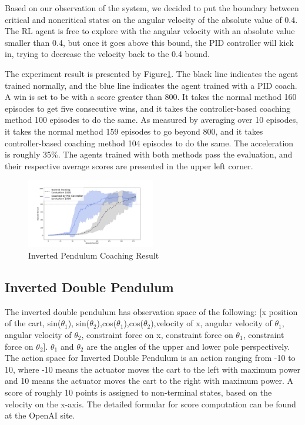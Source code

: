 \documentclass[journal]{IEEEtran}
\begin{document}
Based on our observation of the system, we decided to put the boundary between critical and noncritical states on the angular velocity of the absolute value of 0.4. The RL agent is free to explore with the angular velocity with an absolute value smaller than 0.4, but once it goes above this bound, the PID controller will kick in, trying to decrease the velocity back to the 0.4 bound.

The experiment result is presented by Figure\ref{fig:ip_result}. The black line indicates the agent trained normally, and the blue line indicates the agent trained with a PID coach. A win is set to be with a score greater than 800. It takes the normal method 160 episodes to get five consecutive wins, and it takes the controller-based coaching method 100 episodes to do the same. As measured by averaging over 10 episodes, it takes the normal method 159 episodes to go beyond 800, and it takes controller-based coaching method 104 episodes to do the same. The acceleration is roughly 35\%. The agents trained with both methods pass the evaluation, and their respective average scores are presented in the upper left corner.

\begin{figure}
     \centering
      \includegraphics[width=0.5\textwidth]{ip.png}
      \caption{Inverted Pendulum Coaching Result}
      \label{fig:ip_result}

\end{figure}

\subsection{Inverted Double Pendulum}
The inverted double pendulum has observation space of the following: [x position of the cart, sin($\theta_1$), sin($\theta_2$),cos($\theta_1$),cos($\theta_2$),velocity of x, angular velocity of $\theta_1$, angular velocity of $\theta_2$, constraint force on x, constraint force on $\theta_1$, constraint force on $\theta_2$]. $\theta_1$ and $\theta_2$ are the angles of the upper and lower pole perspectively. The action space for Inverted Double Pendulum is an action ranging from -10 to 10, where -10 means the actuator moves the cart to the left with maximum power and 10 means the actuator moves the cart to the right with maximum power. A score of roughly 10 points is assigned to non-terminal states, based on the velocity on the x-axis. The detailed formular for score computation can be found at the OpenAI site.
\end{document}
